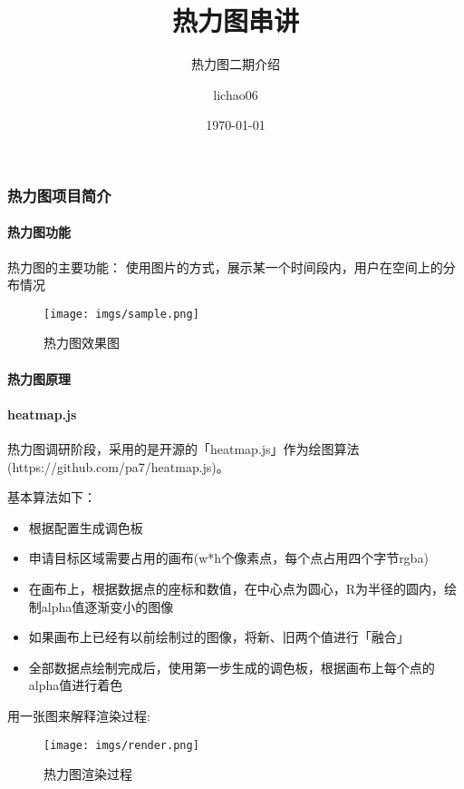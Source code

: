 \documentclass[c]{beamer}
\begin{document}
\begin{CJK}{UTF8}{song}

  \newcommand{\hm}{热力图}
  \newcommand{\hmsnd}{热力图二期}
  \newcommand{\hmfst}{热力图一期}
  \newcommand{\rerd}{实时渲染}
  \newcommand{\steam}{后台服务}
  \newcommand{\cteam}{客户端}
  \newcommand{\toi}{云控制}
\title[\hm{}串讲]{\hm{}串讲}
\author[lichao06]{lichao06}
\subtitle{\hmsnd{}\rtrd{}介绍}
\date{\today}
\frame{\titlepage}

\begin{frame}\frametitle{\hm{}项目简介}
    \framesubtitle{\hm{}功能}
    \hm{}的主要功能：
    使用图片的方式，展示某一个时间段内，用户在空间上的分布情况
    \begin{figure}[htbp]
      \centering
      \texttt{[image: imgs/sample.png]}
      \caption{\hm{}效果图}
      \label{fig:hmsample}
    \end{figure}
\end{frame}

\begin{frame}\framesubtitle{\hm{}原理}
  \framesubtitle{heatmap.js}
  热力图调研阶段，采用的是开源的「heatmap.js」作为绘图算法(https://github.com/pa7/heatmap.js)。

  基本算法如下：
    \begin{itemize}
        \item 根据配置生成调色板
        \item 申请目标区域需要占用的画布(w*h个像素点，每个点占用四个字节rgba)
        \item 在画布上，根据数据点的座标和数值，在中心点为圆心，R为半径的圆内，绘制alpha值逐渐变小的图像
        \item 如果画布上已经有以前绘制过的图像，将新、旧两个值进行「融合」
        \item 全部数据点绘制完成后，使用第一步生成的调色板，根据画布上每个点的alpha值进行着色
    \end{itemize}

    \pause
    用一张图来解释渲染过程:
    \begin{figure}[htbp]
      \centering
      \texttt{[image: imgs/render.png]}
      \caption{\hm{}渲染过程}
      \label{fig:hmrender}
    \end{figure}
\end{frame}


\end{CJK}
\end{document}
